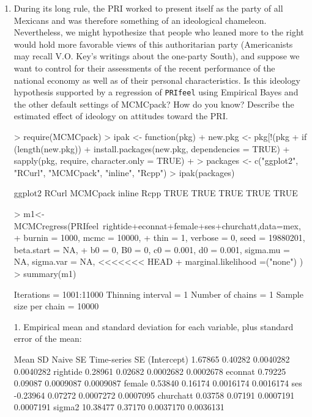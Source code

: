 \documentclass[12pt]{article}
\begin{document}
\begin{enumerate}

\item During its long rule, the PRI worked to present itself as the party of all Mexicans and was therefore something of an ideological chameleon.  Nevertheless, we might hypothesize that people who leaned more to the right would hold more favorable views of this authoritarian party (Americanists may recall V.O. Key's writings about the one-party South), and suppose we want to control for their assessments of the recent performance of the national economy as well as of their personal characteristics.  Is this ideology hypothesis supported by a regression of \texttt{PRIfeel} using Empirical Bayes and the other default settings of MCMCpack?  How do you know?  Describe the estimated effect of ideology on attitudes toward the PRI.  \\

\begin{Schunk}
\begin{Sinput}
> require(MCMCpack)
> ipak <- function(pkg){
+      new.pkg <- pkg[!(pkg %
+      if (length(new.pkg)) 
+          install.packages(new.pkg, dependencies = TRUE)
+      sapply(pkg, require, character.only = TRUE)
+  }
> packages <- c("ggplot2", "RCurl", "MCMCpack", "inline", "Rcpp")
> ipak(packages)
\end{Sinput}
\begin{Soutput}
 ggplot2    RCurl MCMCpack   inline     Rcpp 
    TRUE     TRUE     TRUE     TRUE     TRUE 
\end{Soutput}
\begin{Sinput}
> m1<-MCMCregress(PRIfeel~rightide+econnat+female+ses+churchatt,data=mex,
+     burnin = 1000, mcmc = 10000,
+     thin = 1, verbose = 0, seed = 19880201, beta.start = NA, 
+     b0 = 0, B0 = 0, c0 = 0.001, d0 = 0.001, sigma.mu = NA, sigma.var = NA, 
<<<<<<< HEAD
+     marginal.likelihood =("none") )
> summary(m1)
\end{Sinput}
\begin{Soutput}
Iterations = 1001:11000
Thinning interval = 1 
Number of chains = 1 
Sample size per chain = 10000 

1. Empirical mean and standard deviation for each variable,
   plus standard error of the mean:

                Mean      SD  Naive SE Time-series SE
(Intercept)  1.67865 0.40282 0.0040282      0.0040282
rightide     0.28961 0.02682 0.0002682      0.0002678
econnat      0.79225 0.09087 0.0009087      0.0009087
female       0.53840 0.16174 0.0016174      0.0016174
ses         -0.23964 0.07272 0.0007272      0.0007095
churchatt    0.03758 0.07191 0.0007191      0.0007191
sigma2      10.38477 0.37170 0.0037170      0.0036131


\end{Soutput}
\end{Schunk}
\end{enumerate}
\end{document}
